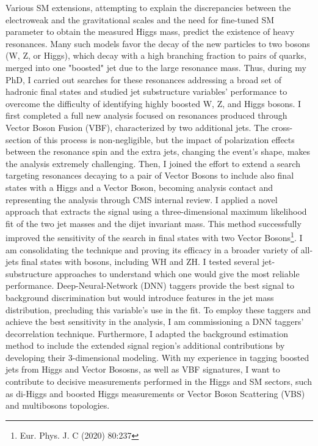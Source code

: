 {Various SM extensions, attempting to explain the discrepancies between the electroweak and the gravitational scales and the need for fine-tuned SM parameter to obtain the measured Higgs mass, predict the existence of heavy resonances. Many such models favor the decay of the new particles to two bosons (W, Z, or Higgs), which decay with a high branching fraction to pairs of quarks, merged into one "boosted" jet due to the large resonance mass. Thus, during my PhD, I carried out searches for these resonances addressing a broad set of hadronic final states and studied jet substructure variables' performance to overcome the difficulty of identifying highly boosted W, Z, and Higgs bosons. I first completed a full new analysis focused on resonances produced through Vector Boson Fusion (VBF), characterized by two additional jets. The cross-section of this process is non-negligible, but the impact of polarization effects between the resonance spin and the extra jets, changing the event's shape, makes the analysis extremely challenging. Then, I joined the effort to extend a search targeting resonances decaying to a pair of Vector Bosons to include also final states with a Higgs and a Vector Boson, becoming analysis contact and representing the analysis through CMS internal review. I applied a novel approach that extracts the signal using a three-dimensional maximum likelihood fit of the two jet masses and the dijet invariant mass. This method successfully improved the sensitivity of the search in final states with two Vector Bosons\footnote{
Eur. Phys. J. C (2020) 80:237}.
I am consolidating the technique and proving its efficacy in a broader variety of all-jets final states with bosons, including WH and ZH.
I tested several jet-substructure approaches to understand which one would give the  most reliable performance. Deep-Neural-Network (DNN) taggers provide the best signal to background discrimination but would introduce features in the jet mass distribution, precluding this variable's use in the fit. To employ these taggers and achieve the best sensitivity in the analysis, I am commissioning a DNN taggers' decorrelation technique. Furthermore, I adapted the background estimation method to include the extended signal region's additional contributions by developing their 3-dimensional modeling. 
With my experience in tagging boosted jets from Higgs and Vector Bososns, as well as VBF signatures, I want to contribute to decisive measurements performed in the Higgs and SM sectors, such as di-Higgs and boosted Higgs measurements or Vector Boson Scattering (VBS) and multibosons topologies. 


}
